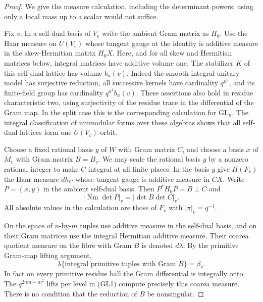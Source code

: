 \begin{proof}
We give the measure calculation, including the determinant
powers; using only a local mass up to a scalar would not
suffice.

Fix \(v\). In a self-dual basis of \(V_v\) write the ambient
Gram matrix as \(H_0\). Use the Haar measure on \(U(V_v)\)
whose tangent gauge at the identity is additive measure in
the skew-Hermitian matrix \(H_0X\). Here, and for all skew
and Hermitian matrices below, integral matrices have additive
volume one. The stabilizer \(K\) of this self-dual lattice
has volume \(b_n(v)\). Indeed the smooth integral unitary
model has surjective reduction, all successive kernels
have cardinality \(q^{n^2}\), and its finite-field group
has cardinality \(q^{n^2}b_n(v)\). These assertions also
hold in residue characteristic two, using surjectivity
of the residue trace in the differential of the Gram map.
In the split case this is the corresponding calculation
for \(\mathrm{GL}_n\). The integral classification of
unimodular forms over these algebras shows that all
self-dual lattices form one \(U(V_v)\)-orbit.

Choose a fixed rational basis \(y\) of \(W\) with Gram
matrix \(C\), and choose a basis \(x\) of \(M_v\) with
Gram matrix \(B=B_v\). We may scale the rational basis
\(y\) by a nonzero rational integer to make \(C\) integral
at all finite places. In the basis \(y\) give \(H(F_v)\)
the Haar measure \(dh_C\) whose tangent gauge is additive
measure in \(CX\). Write \(P=(x,y)\) in the ambient
self-dual basis. Then \(P^*H_0P=B\perp C\) and
\[
 |\operatorname{Nm}\det P|_v=|\det B\det C|_v.
\]
All absolute values in the calculation are those of \(F_v\)
with \(|\pi|_v=q^{-1}\).

On the space of \(n\)-by-\(m\) tuples use additive measure
in the self-dual basis, and on their Gram matrices use the
integral Hermitian additive measure. Their coarea quotient
measure on the fibre with Gram \(B\) is denoted \(d\lambda\).
By the primitive Gram-map lifting argument,
\[
 \lambda\{\text{integral primitive tuples with Gram }B\}=\beta_v.
 \tag{GM2}
\]
In fact on every primitive residue ball the Gram differential
is integrally onto. The \(q^{2nm-m^2}\) lifts per level in
(GL1) compute precisely this coarea measure. There is no
condition that the reduction of \(B\) be nonsingular.


\end{proof}

